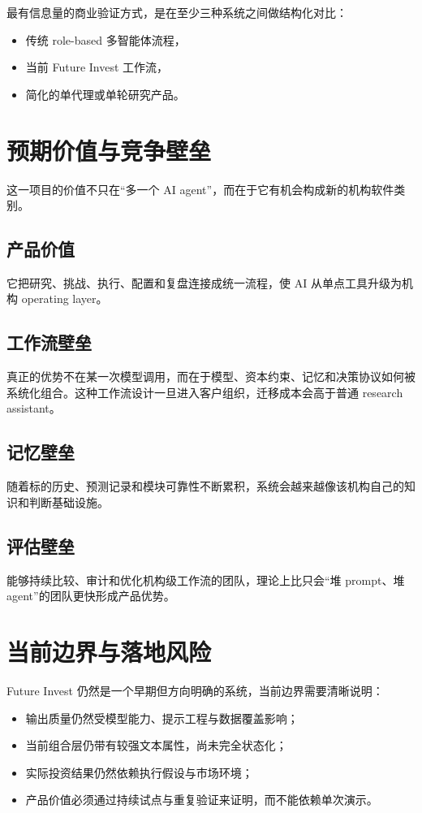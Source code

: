 \documentclass[11pt]{article}
\begin{document}
最有信息量的商业验证方式，是在至少三种系统之间做结构化对比：

\begin{itemize}
\item 传统 role-based 多智能体流程，
\item 当前 Future Invest 工作流，
\item 简化的单代理或单轮研究产品。
\end{itemize}

\section{预期价值与竞争壁垒}

这一项目的价值不只在“多一个 AI agent”，而在于它有机会构成新的机构软件类别。

\subsection{产品价值}
它把研究、挑战、执行、配置和复盘连接成统一流程，使 AI 从单点工具升级为机构 operating layer。

\subsection{工作流壁垒}
真正的优势不在某一次模型调用，而在于模型、资本约束、记忆和决策协议如何被系统化组合。这种工作流设计一旦进入客户组织，迁移成本会高于普通 research assistant。

\subsection{记忆壁垒}
随着标的历史、预测记录和模块可靠性不断累积，系统会越来越像该机构自己的知识和判断基础设施。

\subsection{评估壁垒}
能够持续比较、审计和优化机构级工作流的团队，理论上比只会“堆 prompt、堆 agent”的团队更快形成产品优势。

\section{当前边界与落地风险}

Future Invest 仍然是一个早期但方向明确的系统，当前边界需要清晰说明：

\begin{itemize}
\item 输出质量仍然受模型能力、提示工程与数据覆盖影响；
\item 当前组合层仍带有较强文本属性，尚未完全状态化；
\item 实际投资结果仍然依赖执行假设与市场环境；
\item 产品价值必须通过持续试点与重复验证来证明，而不能依赖单次演示。
\end{itemize}
\end{document}
